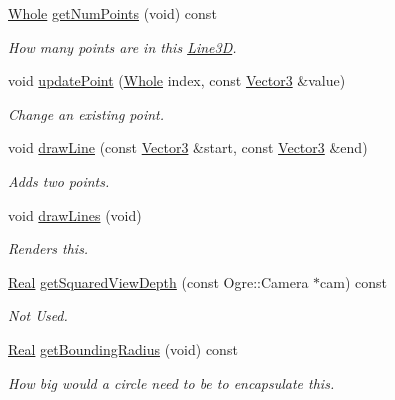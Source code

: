 \begin{DoxyCompactItemize}
\hyperlink{namespacephys_a460f6bc24c8dd347b05e0366ae34f34a}{Whole} \hyperlink{classphys_1_1internal_1_1Line3D_ab72a9dab3a355035c24c15e4a737ea2f}{getNumPoints} (void) const 
\begin{DoxyCompactList}\small\item\em How many points are in this \hyperlink{classphys_1_1internal_1_1Line3D}{Line3D}. \item\end{DoxyCompactList}\item 
void \hyperlink{classphys_1_1internal_1_1Line3D_a4b2dec1619e4456ab0cb034ad34eb9d1}{updatePoint} (\hyperlink{namespacephys_a460f6bc24c8dd347b05e0366ae34f34a}{Whole} index, const \hyperlink{classphys_1_1Vector3}{Vector3} \&value)
\begin{DoxyCompactList}\small\item\em Change an existing point. \item\end{DoxyCompactList}\item 
void \hyperlink{classphys_1_1internal_1_1Line3D_a31bf19dc06547cbe042e1ddfbcf672f3}{drawLine} (const \hyperlink{classphys_1_1Vector3}{Vector3} \&start, const \hyperlink{classphys_1_1Vector3}{Vector3} \&end)
\begin{DoxyCompactList}\small\item\em Adds two points. \item\end{DoxyCompactList}\item 
void \hyperlink{classphys_1_1internal_1_1Line3D_a008f0874c2213002e0c39330561f80f2}{drawLines} (void)
\begin{DoxyCompactList}\small\item\em Renders this. \item\end{DoxyCompactList}\item 
\hyperlink{namespacephys_af7eb897198d265b8e868f45240230d5f}{Real} \hyperlink{classphys_1_1internal_1_1Line3D_a5d2622c10ef432e84cad59634dcee340}{getSquaredViewDepth} (const Ogre::Camera $\ast$cam) const 
\begin{DoxyCompactList}\small\item\em Not Used. \item\end{DoxyCompactList}\item 
\hyperlink{namespacephys_af7eb897198d265b8e868f45240230d5f}{Real} \hyperlink{classphys_1_1internal_1_1Line3D_a3fdd0ff2b7b22cebc71f796431afc7c8}{getBoundingRadius} (void) const 
\begin{DoxyCompactList}\small\item\em How big would a circle need to be to encapsulate this. \item\end{DoxyCompactList}\end{DoxyCompactItemize}
